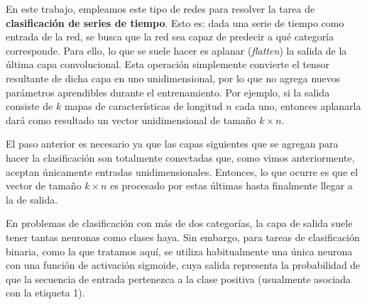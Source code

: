 \documentclass[../../main.tex]{subfiles}
\begin{document}
\bigskip
En este trabajo, empleamos este tipo de redes para resolver la tarea de
\textbf{clasificación de series de tiempo}. Esto es: dada una serie de tiempo como entrada
de la red, se busca que la red sea capaz de predecir a qué categoría corresponde. Para
ello, lo que se suele hacer es aplanar (\textit{flatten}) la salida de la última capa
convolucional. Esta operación simplemente convierte el tensor resultante de dicha capa en
uno unidimensional, por lo que no agrega nuevos parámetros aprendibles durante el
entrenamiento. Por ejemplo, si la salida consiste de \(k\) mapas de características de
longitud \(n\) cada uno, entonces aplanarla dará como resultado un vector unidimensional
de tamaño \(k \times n\).

El paso anterior es necesario ya que las capas siguientes que se agregan para hacer la
clasificación son totalmente conectadas que, como vimos anteriormente, aceptan únicamente
entradas unidimensionales. Entonces, lo que ocurre es que el vector de tamaño \(k \times
n\) es procesado por estas últimas hasta finalmente llegar a la de salida.

En problemas de clasificación con más de dos categorías, la capa de salida suele tener
tantas neuronas como clases haya. Sin embargo, para tareas de clasificación binaria, como
la que tratamos aquí, se utiliza habitualmente una única neurona con una función de
activación sigmoide, cuya salida representa la probabilidad de que la secuencia de entrada
pertenezca a la clase positiva (usualmente asociada con la etiqueta 1).
\end{document}
